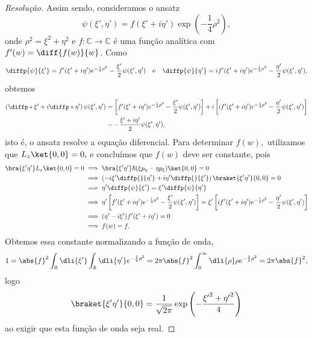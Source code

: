 \begin{proof}[Resolução]
   Assim sendo, consideramos o ansatz
   \begin{equation*}
      \psi(\xi',\eta') = f(\xi' + i \eta') \exp\left(-\frac14 \rho^2\right),
   \end{equation*}
   onde \(\rho^2 = \xi^2 + \eta^2\) e \(f : \mathbb{C} \to \mathbb{C}\) é uma função analítica com \(f'(w) = \diff{f(w)}{w}\). Como
   \begin{equation*}
      \diffp{\psi}{\xi'} = f'(\xi' + i \eta') e^{-\frac14\rho^2} - \frac{\xi'}{2} \psi(\xi', \eta')
      \quad\text{e}\quad
      \diffp{\psi}{\eta'} = if'(\xi' + i \eta') e^{-\frac14\rho^2} - \frac{\eta'}{2} \psi(\xi', \eta'),
   \end{equation*}
   obtemos
   \begin{align*}
      \left(\diffp*{}{\xi'} + i \diffp*{}{\eta'}\right)\psi(\xi', \eta') &= \left[f'(\xi' + i \eta') e^{-\frac14\rho^2} - \frac{\xi'}{2} \psi(\xi', \eta')\right] + i\left[if'(\xi' + i \eta') e^{-\frac14\rho^2} - \frac{\eta'}{2} \psi(\xi', \eta')\right]\\
      &= -\frac{\xi' + i \eta'}{2} \psi(\xi', \eta'),
   \end{align*}
   isto é, o ansatz resolve a equação diferencial. Para determinar \(f(w),\) utilizamos que \(L_z \ket{0,0} = 0,\) e concluímos que \(f(w)\) deve ser constante, pois
   \begin{align*}
      \bra{\xi'\eta'} L_z \ket{0,0} = 0 &\implies \bra{\xi'\eta'}\hbar (\xi p_\eta - \eta p_\xi)\ket{0,0} = 0\\
                                        &\implies \left(-i\xi' \diffp{}{\eta'} + i\eta' \diffp{}{\xi'}\right)\braket{\xi'\eta'}{0,0} = 0\\
                                        &\implies \eta' \diffp{\psi}{\xi'} = \xi' \diffp{\psi}{\eta'}\\
                                        &\implies \eta'\left[f'(\xi' + i \eta') e^{-\frac14\rho^2} - \frac{\xi'}{2} \psi(\xi', \eta')\right] = \xi' \left[if'(\xi' + i \eta') e^{-\frac14\rho^2} - \frac{\eta'}{2} \psi(\xi', \eta')\right]\\
                                        &\implies (\eta' - i \xi') f'(\xi' + i \eta') = 0\\
                                        &\implies f(w) = f.
   \end{align*}
   Obtemos essa constante normalizando a função de onda,
   \begin{equation*}
      1 = \abs{f}^2\int_{\mathbb{R}} \dli{\xi'} \int_{\mathbb{R}} \dli{\eta'} e^{-\frac12 \rho^2} = 2\pi\abs{f}^2 \int_0^\infty \dli{\rho} \rho e^{-\frac12 \rho^2} = 2\pi \abs{f}^2,
   \end{equation*}
   logo
   \begin{equation*}
      \braket{\xi'\eta'}{0,0} = \frac{1}{\sqrt{2\pi}}\exp\left(-\frac{{\xi'}^2 + {\eta'}^2}{4}\right)
   \end{equation*}
   ao exigir que esta função de onda seja real.


\end{proof}

